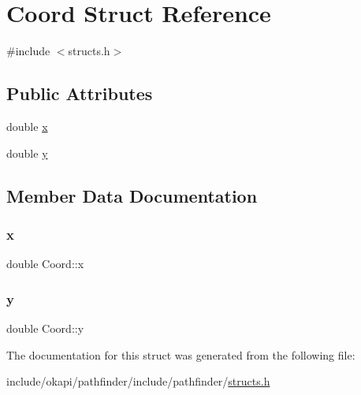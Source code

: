 \hypertarget{structCoord}{}\section{Coord Struct Reference}
\label{structCoord}


{\ttfamily \#include $<$structs.\+h$>$}

\subsection*{Public Attributes}
\begin{DoxyCompactItemize}
\item 
double \mbox{\hyperlink{structCoord_a0172a22ee75843a96e3a84ebc25f3de7}{x}}
\item 
double \mbox{\hyperlink{structCoord_af6e543e0522076e717bae53102655b87}{y}}
\end{DoxyCompactItemize}


\subsection{Member Data Documentation}
\mbox{\label{structCoord_a0172a22ee75843a96e3a84ebc25f3de7}} 
\subsubsection{\texorpdfstring{x}{x}}
{\footnotesize\ttfamily double Coord\+::x}

\mbox{\label{structCoord_af6e543e0522076e717bae53102655b87}} 
\subsubsection{\texorpdfstring{y}{y}}
{\footnotesize\ttfamily double Coord\+::y}



The documentation for this struct was generated from the following file\+:\begin{DoxyCompactItemize}
\item 
include/okapi/pathfinder/include/pathfinder/\mbox{\hyperlink{structs_8h}{structs.\+h}}\end{DoxyCompactItemize}
